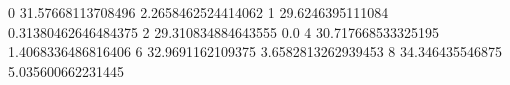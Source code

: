 0 31.57668113708496 2.2658462524414062
1 29.6246395111084 0.31380462646484375
2 29.310834884643555 0.0
4 30.717668533325195 1.4068336486816406
6 32.9691162109375 3.6582813262939453
8 34.346435546875 5.035600662231445
